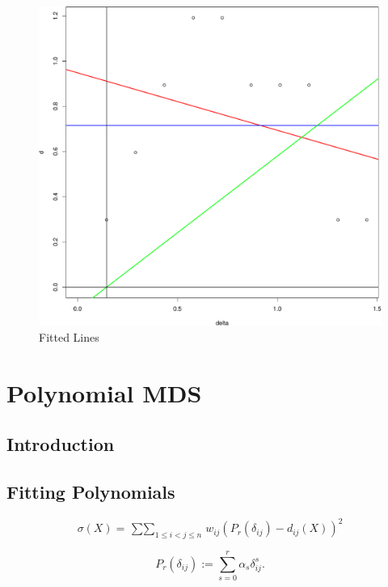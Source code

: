 \documentclass[
  12pt,
  letterpaper,
  DIV=11,
  numbers=noendperiod]{scrreprt}
\theoremstyle{remark}
\begin{document}
\begin{figure}[H]

{\centering \includegraphics{interval_files/figure-pdf/intlineex-1.pdf}

}

\caption{Fitted Lines}

\end{figure}%


\chapter{Polynomial MDS}\label{polynomial-mds}

\section{Introduction}\label{introduction}

\section{Fitting Polynomials}\label{fitting-polynomials}

\[
\sigma(X)=\mathop{\sum\sum}_{1\leq i<j\leq n}w_{ij}(P_r(\delta_{ij})-d_{ij}(X))^2
\]

\[
P_r(\delta_{ij}):=\sum_{s=0}^r\alpha_s^{\ }\delta_{ij}^s.
\]
\end{document}
